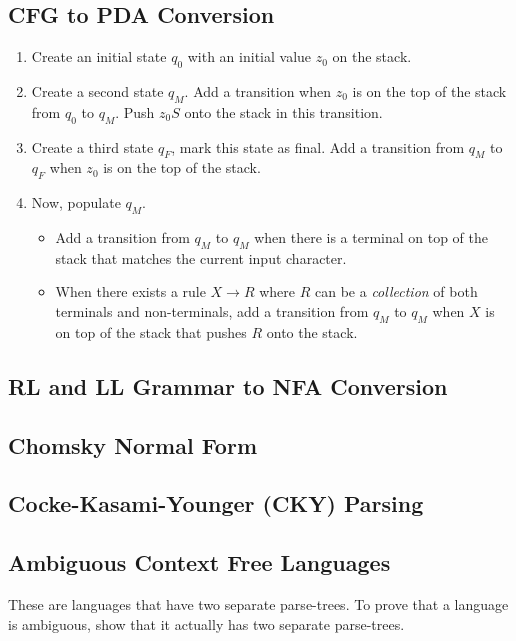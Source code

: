 \subsection{CFG to PDA Conversion}
\begin{enumerate}
    \item Create an initial state $q_0$ with an initial value $z_0$ on the stack.
    \item Create a second state $q_M$. Add a transition when $z_0$ is on the
    top of the stack from $q_0$ to $q_M$. Push $z_0S$ onto the stack in this
    transition.
    \item Create a third state $q_F$, mark this state as final. Add a transition
    from $q_M$ to $q_F$ when $z_0$ is on the top of the stack.
    \item Now, populate $q_M$.
    \begin{itemize}
        \item Add a transition from $q_M$ to $q_M$ when there is a terminal 
        on top of the stack that matches the current input character.
        \item When there exists a rule
        $X \to R$ where $R$ can be a \textit{collection} of both terminals and
        non-terminals, add a transition from $q_M$ to $q_M$ when $X$ is on
        top of the stack that pushes $R$ onto the stack.
    \end{itemize}
\end{enumerate}

\subsection{RL and LL Grammar to NFA Conversion}

\subsection{Chomsky Normal Form}
\subsection{Cocke-Kasami-Younger (CKY) Parsing}

\subsection{Ambiguous Context Free Languages}
These are languages that have two separate parse-trees. To prove
that a language is ambiguous, show that it actually has two separate
parse-trees.

